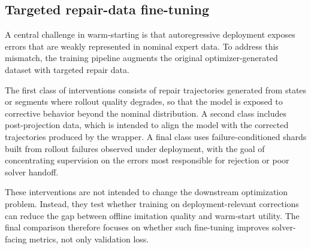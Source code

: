 \subsection{Targeted repair-data fine-tuning}

A central challenge in warm-starting is that autoregressive deployment exposes errors that are weakly represented in nominal expert data. To address this mismatch, the training pipeline augments the original optimizer-generated dataset with targeted repair data.

The first class of interventions consists of repair trajectories generated from states or segments where rollout quality degrades, so that the model is exposed to corrective behavior beyond the nominal distribution. A second class includes post-projection data, which is intended to align the model with the corrected trajectories produced by the wrapper. A final class uses failure-conditioned shards built from rollout failures observed under deployment, with the goal of concentrating supervision on the errors most responsible for rejection or poor solver handoff.

These interventions are not intended to change the downstream optimization problem. Instead, they test whether training on deployment-relevant corrections can reduce the gap between offline imitation quality and warm-start utility. The final comparison therefore focuses on whether such fine-tuning improves solver-facing metrics, not only validation loss.
